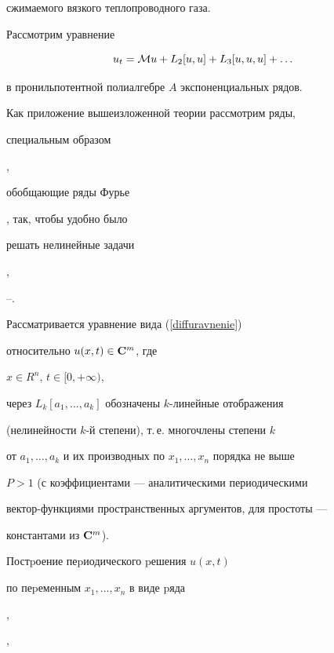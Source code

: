 сжимаемого вязкого теплопроводного газа.





Рассмотрим уравнение


\begin{equation}


\label{diffuravnenie}


u_t={\cal{M}}u+L_2[u,u]+L_3[u,u,u]+\dots


\end{equation}


в пронильпотентной полиалгебре $A$ \cite{Titov1} экспоненциальных рядов.


Как приложение вышеизложенной теории рассмотрим ряды,


специальным образом


\cite{F23},


\cite{SidorovKorzuninFilimonov}


обобщающие ряды Фурье


\cite{Zigmund}, \cite{Bari} так, чтобы удобно было


решать нелинейные задачи


\cite{SidorovKorzuninFilimonov},


\cite{BautinNS1}--\cite{AMIlyin}.





Рассматривается уравнение вида (\ref{diffuravnenie})


относительно $ u(x,t)\in {\bold C^m}$, где


$x\in R^n$, $t\in[0,+\infty)$,


через $L_k[a_1,\dotsc,a_k]$ обозначены $k$-линейные отображения


(нелинейности $k$-й степени), т.\,е. многочлены степени $k$


от $a_1,\dotsc,a_k$ и их производных по $x_1,\dotsc,x_n$ порядка не выше


$P>1$ (с коэффициентами --- аналитическими периодическими


вектор-функциями пространственных аргументов, для простоты ---


константами из $\bold C^m$).





Постpоение пеpиодического pешения $u(x,t)$


по пеpеменным $x_1,\dotsc,x_n$ в виде pяда


\cite{F23},


\cite{SidorovKorzuninFilimonov},



